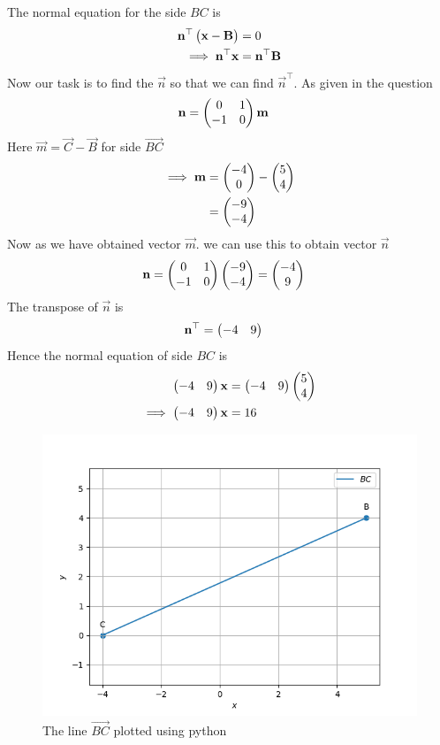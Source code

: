 \documentclass[11pt]{book}
\begin{document}
\begin{enumerate}[label=\thesection.\arabic*.,ref=\thesection.\theenumi]
       The normal equation for the side $BC$ is
\begin{align}
\mathbf{n}^{\top}\begin{pmatrix}\mathbf{x}-\mathbf{B}\end{pmatrix}&=0\\
\implies
\mathbf{n}^{\top}\mathbf{x}&=\mathbf{n}^{\top}\mathbf{B}
\end{align}
Now our task is to find the $\vec{n}$ so that we can find $\vec{n}^{\top}$.
As given in the question 
\begin{align}
  \mathbf{n} &= \begin{pmatrix}0 & 1\\
  -1 & 0\end{pmatrix}\mathbf{m}
\end{align}
Here $\vec{m} = \vec{C}- \vec{B}$ for side $\vec{BC}$
\begin{align}
\implies
\mathbf{m}&=\begin{pmatrix}-4\\0\end{pmatrix} - \begin{pmatrix}5\\4\end{pmatrix}\\
&=\begin{pmatrix}-9\\-4\end{pmatrix}
\end{align}
Now as we have obtained vector $\vec{m}$.
we can use this to obtain vector $\vec{n}$
\begin{align}
\mathbf{n} &= \begin{pmatrix}0 & 1\\
  -1 & 0\end{pmatrix}\begin{pmatrix}-9\\-4\end{pmatrix}
 = \begin{pmatrix}-4\\9\end{pmatrix}
\end{align}
The transpose of $\vec{n}$ is
\begin{align}
  \mathbf{n}^{\top}&=\begin{pmatrix}-4 & 9\end{pmatrix}
\end{align}
Hence the normal equation of side $BC$ is 
\begin{align}
    \begin{pmatrix}-4 & 9\end{pmatrix}\mathbf{x}&=\begin{pmatrix}-4 & 9\end{pmatrix}\begin{pmatrix}5\\4\end{pmatrix}\\
    \implies
    \begin{pmatrix}-4 & 9\end{pmatrix}\mathbf{x}&=16
\end{align}
\begin{figure}
\includegraphics [width=\columnwidth] {figs/BCline.png}
\caption{ The line $\vec{BC}$ plotted using python}
\label{fig: linebc}
\end{figure}




\end{enumerate}
\end{document}
